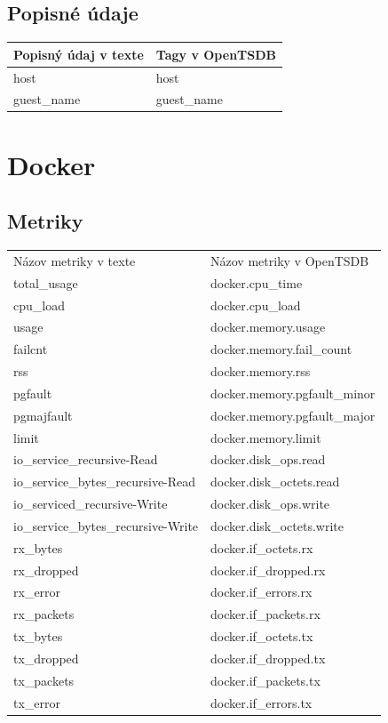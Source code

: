 \documentclass[printed,11pt,twoside,color,cover,table]{fithesis3}
\begin{document}
\subsection{Popisné údaje}

\begin{center}
    \begin{tabular}{| l | l |}
    \hline
    Popisný údaj v texte & Tagy v OpenTSDB \\ \hline
    host & host\\ \hline
    guest\_name & guest\_name\\ \hline
    \end{tabular}
\end{center}

\section{Docker}
\subsection{Metriky}
\begin{center}
    \begin{tabular}{| l | l |}
    \hline
    Názov metriky v texte & Názov metriky v OpenTSDB \\
	total\_usage & docker.cpu\_time \\ \hline
    cpu\_load & docker.cpu\_load \\ \hline
    usage & docker.memory.usage \\ \hline
    failcnt & docker.memory.fail\_count \\ \hline
    rss & docker.memory.rss \\ \hline
    pgfault & docker.memory.pgfault\_minor \\ \hline
    pgmajfault & docker.memory.pgfault\_major \\ \hline
    limit & docker.memory.limit \\ \hline
    io\_service\_recursive-Read & docker.disk\_ops.read\\ \hline
    io\_service\_bytes\_recursive-Read & docker.disk\_octets.read\\ \hline
    io\_serviced\_recursive-Write & docker.disk\_ops.write\\ \hline
    io\_service\_bytes\_recursive-Write & docker.disk\_octets.write\\ \hline
    rx\_bytes & docker.if\_octets.rx\\ \hline
    rx\_dropped & docker.if\_dropped.rx\\ \hline
    rx\_error & docker.if\_errors.rx\\ \hline
    rx\_packets & docker.if\_packets.rx\\ \hline
    tx\_bytes & docker.if\_octets.tx\\ \hline
    tx\_dropped & docker.if\_dropped.tx\\ \hline
    tx\_packets & docker.if\_packets.tx\\ \hline
    tx\_error & docker.if\_errors.tx\\ \hline
    \end{tabular}
\end{center}
\end{document}
